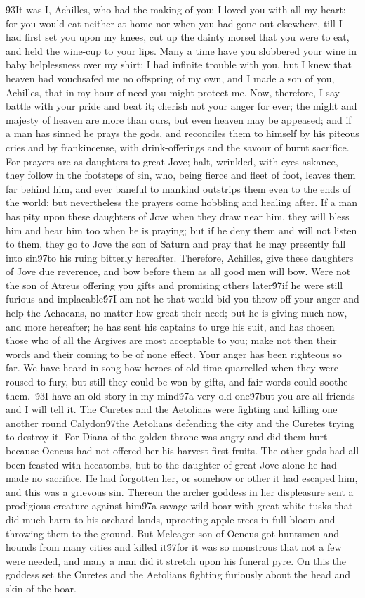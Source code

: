 {\'93It was I, Achilles, who had the making of you; I loved you with all my heart: for you would eat neither at home nor when you had gone out elsewhere, till I had first set you upon my knees, cut up the dainty morsel that you were to eat, and held the wine-cup to your lips. Many a time have you slobbered your wine in baby helplessness over my shirt; I had infinite trouble with you, but I knew that heaven had vouchsafed me no offspring of my own, and I made a son of you, Achilles, that in my hour of need you might protect me. Now, therefore, I say battle with your pride and beat it; cherish not your anger for ever; the might and majesty of heaven are more than ours, but even heaven may be appeased; and if a man has sinned he prays the gods, and reconciles them to himself by his piteous cries and by frankincense, with drink-offerings and the savour of burnt sacrifice. For prayers are as daughters to great Jove; halt, wrinkled, with eyes askance, they follow in the footsteps of sin, who, being fierce and fleet of foot, leaves them far behind him, and ever baneful to mankind outstrips them even to the ends of the world; but nevertheless the prayers come hobbling and healing after. If a man has pity upon these daughters of Jove when they draw near him, they will bless him and hear him too when he is praying; but if he deny them and will not listen to them, they go to Jove the son of Saturn and pray that he may presently fall into sin\'97to his ruing bitterly hereafter. Therefore, Achilles, give these daughters of Jove due reverence, and bow before them as all good men will bow. Were not the son of Atreus offering you gifts and promising others later\'97if he were still furious and implacable\'97I am not he that would bid you throw off your anger and help the Achaeans, no matter how great their need; but he is giving much now, and more hereafter; he has sent his captains to urge his suit, and has chosen those who of all the Argives are most acceptable to you; make not then their words and their coming to be of none effect. Your anger has been righteous so far. We have heard in song how heroes of old time quarrelled when they were roused to fury, but still they could be won by gifts, and fair words could soothe them.\
\'93I have an old story in my mind\'97a very old one\'97but you are all friends and I will tell it. The Curetes and the Aetolians were fighting and killing one another round Calydon\'97the Aetolians defending the city and the Curetes trying to destroy it. For Diana of the golden throne was angry and did them hurt because Oeneus had not offered her his harvest first-fruits. The other gods had all been feasted with hecatombs, but to the daughter of great Jove alone he had made no sacrifice. He had forgotten her, or somehow or other it had escaped him, and this was a grievous sin. Thereon the archer goddess in her displeasure sent a prodigious creature against him\'97a savage wild boar with great white tusks that did much harm to his orchard lands, uprooting apple-trees in full bloom and throwing them to the ground. But Meleager son of Oeneus got huntsmen and hounds from many cities and killed it\'97for it was so monstrous that not a few were needed, and many a man did it stretch upon his funeral pyre. On this the goddess set the Curetes and the Aetolians fighting furiously about the head and skin of the boar.\
}

